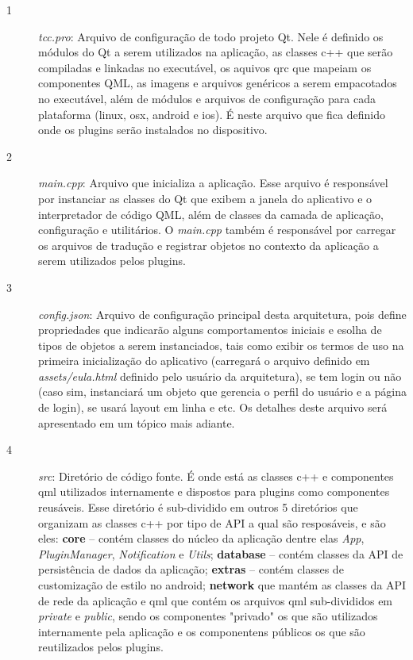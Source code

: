 \begin{description}
	\item[1] \textit{tcc.pro}: Arquivo de configuração de todo projeto Qt. Nele é definido os módulos do Qt a serem utilizados na aplicação, as classes c++ que serão compiladas e linkadas no executável, os aquivos qrc que mapeiam os componentes QML, as imagens e arquivos genéricos a serem empacotados no executável, além de módulos e arquivos de configuração para cada plataforma (linux, osx, android e ios). É neste arquivo que fica definido onde os plugins serão instalados no dispositivo.

	\item[2] \textit{main.cpp}: Arquivo que inicializa a aplicação. Esse arquivo é responsável por instanciar as classes do Qt que exibem a janela do aplicativo e o interpretador de código QML, além de classes da camada de aplicação, configuração e utilitários. O \textit{main.cpp} também é responsável por carregar os arquivos de tradução e registrar objetos no contexto da aplicação a serem utilizados pelos plugins.

	\item[3] \textit{config.json}: Arquivo de configuração principal desta arquitetura, pois define propriedades que indicarão alguns comportamentos iniciais e esolha de tipos de objetos a serem instanciados, tais como exibir os termos de uso na primeira inicialização do aplicativo (carregará o arquivo definido em \textit{assets/eula.html} definido pelo usuário da arquitetura), se tem login ou não (caso sim, instanciará um objeto que gerencia o perfil do usuário e a página de login), se usará layout em linha e etc. Os detalhes deste arquivo será apresentado em um tópico mais adiante.

	\item[4] \textit{src}: Diretório de código fonte. É onde está as classes c++ e componentes qml utilizados internamente e dispostos para plugins como componentes reusáveis. Esse diretório é sub-dividido em outros 5 diretórios que organizam as classes c++ por tipo de API a qual são resposáveis, e são eles: \textbf{core} -- contém classes do núcleo da aplicação dentre elas \textit{App}, \textit{PluginManager}, \textit{Notification} e \textit{Utils}; \textbf{database} -- contém classes da API de persistência de dados da aplicação; \textbf{extras} -- contém classes de customização de estilo no android; \textbf{network} que mantém as classes da API de rede da aplicação e qml que contém os arquivos qml sub-divididos em \textit{private} e \textit{public}, sendo os componentes "privado" os que são utilizados internamente pela aplicação e os componentens públicos os que são reutilizados pelos plugins.


\end{description}
